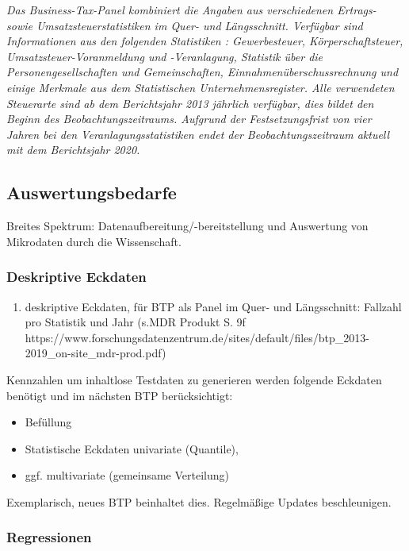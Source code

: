 \documentclass[
  german,
  10pt,
  twoside]{article}
\providecommand{\tightlist}{%
  \setlength{\itemsep}{0pt}\setlength{\parskip}{0pt}}
\begin{document}
\emph{Das Business-Tax-Panel kombiniert die Angaben aus verschiedenen
Ertrags- sowie Umsatzsteuerstatistiken im Quer- und Längsschnitt.
Verfügbar sind Informationen aus den folgenden Statistiken :
Gewerbesteuer, Körperschaftsteuer, Umsatzsteuer-Voranmeldung und
-Veranlagung, Statistik über die Personengesellschaften und
Gemeinschaften, Einnahmenüberschussrechnung und einige Merkmale aus dem
Statistischen Unternehmensregister. Alle verwendeten Steuerarte sind ab
dem Berichtsjahr 2013 jährlich verfügbar, dies bildet den Beginn des
Beobachtungszeitraums. Aufgrund der Festsetzungsfrist von vier Jahren
bei den Veranlagungsstatistiken endet der Beobachtungszeitraum aktuell
mit dem Berichtsjahr 2020.}

\subsection{Auswertungsbedarfe}\label{auswertungsbedarfe}

Breites Spektrum: Datenaufbereitung/-bereitstellung und Auswertung von
Mikrodaten durch die Wissenschaft.

\subsubsection{Deskriptive Eckdaten}\label{deskriptive-eckdaten}

\begin{enumerate}
\def\labelenumi{\arabic{enumi}.}
\tightlist
\item
  deskriptive Eckdaten, für BTP als Panel im Quer- und Längsschnitt:
  Fallzahl pro Statistik und Jahr (s.MDR Produkt S. 9f
  https://www.forschungsdatenzentrum.de/sites/default/files/btp\_2013-2019\_on-site\_mdr-prod.pdf)
\end{enumerate}

Kennzahlen um inhaltlose Testdaten zu generieren werden folgende
Eckdaten benötigt und im nächsten BTP berücksichtigt:

\begin{itemize}
\tightlist
\item
  Befüllung
\item
  Statistische Eckdaten univariate (Quantile),
\item
  ggf. multivariate (gemeinsame Verteilung)
\end{itemize}

Exemplarisch, neues BTP beinhaltet dies. Regelmäßige Updates
beschleunigen.

\subsubsection{Regressionen}\label{regressionen}
\end{document}

